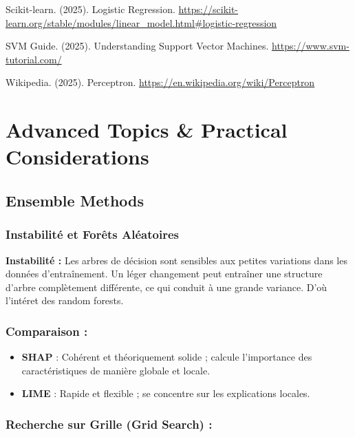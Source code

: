 \documentclass[10pt,a4paper]{article}
\begin{document}

\begin{thebibliography}{9}
Scikit-learn. (2025). Logistic Regression.
\url{https://scikit-learn.org/stable/modules/linear_model.html#logistic-regression}

SVM Guide. (2025). Understanding Support Vector Machines.
\url{https://www.svm-tutorial.com/}

Wikipedia. (2025). Perceptron.
\url{https://en.wikipedia.org/wiki/Perceptron}
\end{thebibliography}



\section*{Advanced Topics \& Practical Considerations}

\subsection*{Ensemble Methods}

\subsubsection*{Instabilité et Forêts Aléatoires}

\textbf{Instabilité :}
Les arbres de décision sont sensibles aux petites variations dans les données d'entraînement. Un léger changement peut entraîner une structure d'arbre complètement différente, ce qui conduit à une grande variance. D'où l'intéret des random forests.

\subsubsection*{Comparaison :}
\begin{itemize}
    \item \textbf{SHAP} : Cohérent et théoriquement solide ; calcule l'importance des caractéristiques de manière globale et locale.
    \item \textbf{LIME} : Rapide et flexible ; se concentre sur les explications locales.
\end{itemize}

\subsubsection*{Recherche sur Grille (Grid Search) :}
\end{document}
